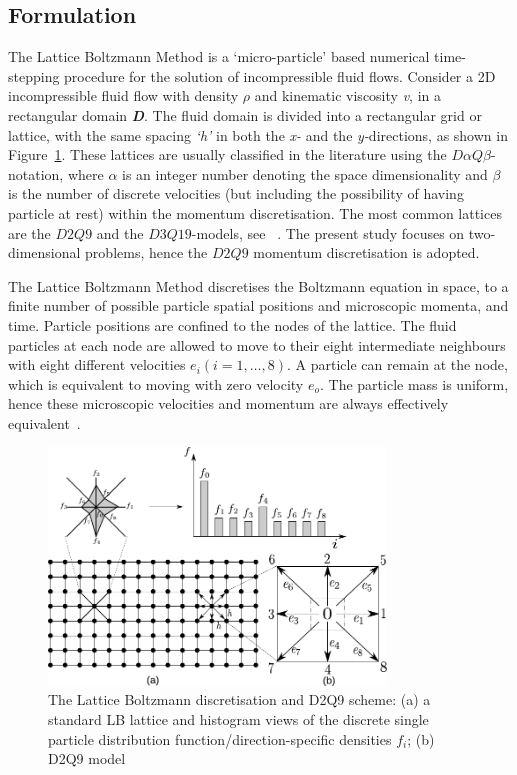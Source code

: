 \subsection{Formulation}
The Lattice Boltzmann Method is a `micro-particle' based numerical time-stepping procedure for the solution of incompressible fluid flows. Consider a 2D incompressible fluid flow with density $\rho$ and kinematic viscosity \textit{v}, in a rectangular domain \textit{\textbf{D}}. The fluid domain is divided into a rectangular grid or lattice, with the same spacing \textit{`h'} in both the \textit{x-} and the \textit{y-}directions, as shown in Figure~\ref{fig:D2Q9}. These lattices are usually classified in the literature using the $\textit{D}\alpha\textit{Q}\beta$-notation, where $\alpha$ is an integer number denoting the space dimensionality and $\beta$ is the number of discrete velocities (but including the possibility of having particle at rest) within the momentum discretisation. The most common lattices are the $\textit{D2Q9}$ and the $\textit{D3Q19}$-models, see ~\citet{he1997}. The present study focuses on two-dimensional problems, hence the $\textit{D2Q9}$ momentum discretisation is adopted.

The Lattice Boltzmann Method discretises the Boltzmann equation in space, to a finite number of possible particle spatial positions and microscopic momenta, and time. Particle positions are confined to the nodes of the lattice. The fluid particles at each node are allowed to move to their eight intermediate neighbours with eight different velocities $\textit{e}_{\textit{i}} (\textit{i}=1,\dots,8)$. A particle can remain at the node, which is equivalent to moving with zero velocity $\textit{e}_{\textit{o}}$. The particle mass is uniform, hence these microscopic velocities and momentum are always effectively equivalent~\citep{han2007}.

\begin{figure}[htpb]
\centering
\includegraphics[width=0.8\textwidth]{Chapter3/figures/lbm/D2Q9.pdf}
\caption[The Lattice Boltzmann discretisation and D2Q9 scheme]{The Lattice Boltzmann discretisation and D2Q9 scheme: (a) a standard LB lattice and histogram views of the discrete single particle distribution function/direction-specific densities $f_i$; (b) D2Q9 model}
\label{fig:D2Q9}
\end{figure}

